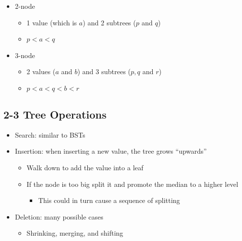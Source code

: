 \documentclass[
  10pt,
  english,
  letterpaper,
,tablecaptionabove
]{scrartcl}
\providecommand{\tightlist}{%
  \setlength{\itemsep}{0pt}\setlength{\parskip}{0pt}}
\begin{document}
\begin{itemize}
\tightlist
\item
  2-node

  \begin{itemize}
  \tightlist
  \item
    1 value (which is \(a\)) and 2 subtrees (\(p\) and \(q\))
  \item
    \(p < a < q\)
  \end{itemize}
\item
  3-node

  \begin{itemize}
  \tightlist
  \item
    2 values (\(a\) and \(b\)) and 3 subtrees (\(p,q\) and \(r\))
  \item
    \(p < a < q < b < r\)
  \end{itemize}
\end{itemize}

\hypertarget{tree-operations}{%
\subsection{2-3 Tree Operations}\label{tree-operations}}

\begin{itemize}
\tightlist
\item
  Search: similar to BSTs
\item
  Insertion: when inserting a new value, the tree grows
  \enquote{upwards}

  \begin{itemize}
  \tightlist
  \item
    Walk down to add the value into a leaf
  \item
    If the node is too big split it and promote the median to a higher
    level

    \begin{itemize}
    \tightlist
    \item
      This could in turn cause a sequence of splitting
    \end{itemize}
  \end{itemize}
\item
  Deletion: many possible cases

  \begin{itemize}
  \tightlist
  \item
    Shrinking, merging, and shifting
  \end{itemize}
\end{itemize}
\end{document}

